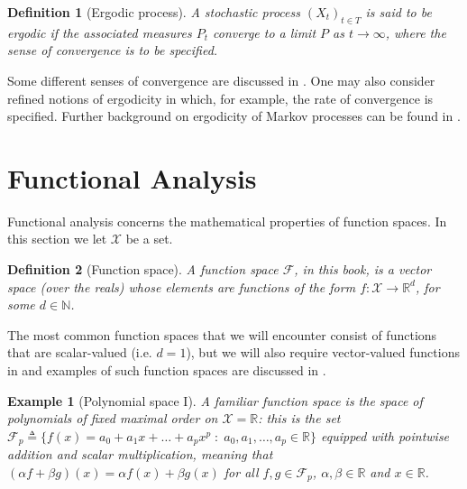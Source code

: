 \documentclass[12pt,paper=letter]{scrreprt}
\newtheorem{definition}{Definition}[chapter]
\newtheorem{example}{Example}[chapter]
\def\defeq{\triangleq} %
\begin{document}
\begin{definition}[Ergodic process]
A stochastic process $(X_t)_{t \in T}$ is said to be \emph{ergodic} if the associated measures $P_t$ converge to a limit $P$ as $t \rightarrow \infty$, where the sense of convergence is to be specified.
\end{definition}

\noindent Some different senses of convergence are discussed in .
One may also consider refined notions of ergodicity in which, for example, the rate of convergence is specified.
Further background on ergodicity of Markov processes can be found in \citet{gallegos2024equivalences}.













\section{Functional Analysis}
\label{sec: functional analysis}

Functional analysis concerns the mathematical properties of function spaces.
In this section we let $\mathcal{X}$ be a set.

\begin{definition}[Function space]
A \emph{function space} $\mathcal{F}$, in this book, is a vector space (over the reals) whose elements are functions of the form $f : \mathcal{X} \rightarrow \mathbb{R}^d$, for some $d \in \mathbb{N}$.
\end{definition}

The most common function spaces that we will encounter consist of functions that are scalar-valued (i.e. $d = 1$), but we will also require vector-valued functions in  and examples of such function spaces are discussed in .

\begin{example}[Polynomial space I] \label{ex: poly space}
A familiar function space is the space of polynomials of fixed maximal order on $\mathcal{X} = \mathbb{R}$: this is the set $\mathcal{F}_p \defeq \{f(x) = a_0 + a_1 x + \dots + a_p x^p \; : \; a_0, a_1,\dots,a_p \in \mathbb{R}\}$ equipped with pointwise addition and scalar multiplication, meaning that $(\alpha f + \beta g)(x) = \alpha f(x) + \beta g(x)$ for all $f,g \in \mathcal{F}_p$, $\alpha,\beta \in \mathbb{R}$ and $x \in \mathbb{R}$.
\end{example}
\end{document}
